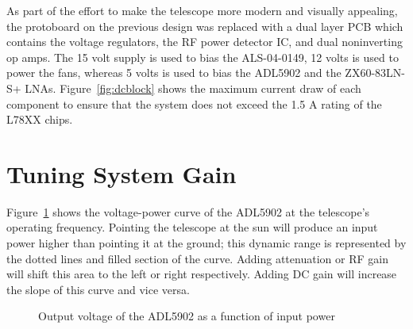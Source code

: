 \documentclass[titlepage]{article}
\begin{document}
As part of the effort to make the telescope more modern and visually appealing, the protoboard on the previous design was replaced with a dual layer PCB which contains the voltage regulators, the RF power detector IC, and dual noninverting op amps. The 15 volt supply is used to bias the ALS-04-0149, 12 volts is used to power the fans, whereas 5 volts is used to bias the ADL5902 and the ZX60-83LN-S+ LNAs. Figure~\ref{fig:dcblock} shows the maximum current draw of each component to ensure that the system does not exceed the 1.5 A rating of the L78XX chips.


\section{Tuning System Gain}
Figure~\ref{fig:vpcurve} shows the voltage-power curve of the ADL5902 at the telescope's operating frequency. Pointing the telescope at the sun will produce an input power higher than pointing it at the ground; this dynamic range is represented by the dotted lines and filled section of the curve. Adding attenuation or RF gain will shift this area to the left or right respectively. Adding DC gain will increase the slope of this curve and vice versa.
\begin{figure}[!ht]
\begin{center}
\caption{Output voltage of the ADL5902 as a function of input power}
\label{fig:vpcurve}
\end{center}
\end{figure}
\end{document}
